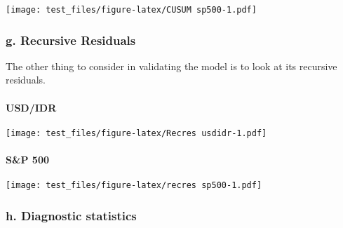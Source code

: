 \documentclass[]{article}
\newenvironment{Shaded}{\begin{snugshade}}{\end{snugshade}}
\newcommand{\KeywordTok}[1]{\textcolor[rgb]{0.13,0.29,0.53}{\textbf{#1}}}
\newcommand{\DataTypeTok}[1]{\textcolor[rgb]{0.13,0.29,0.53}{#1}}
\newcommand{\DecValTok}[1]{\textcolor[rgb]{0.00,0.00,0.81}{#1}}
\newcommand{\StringTok}[1]{\textcolor[rgb]{0.31,0.60,0.02}{#1}}
\newcommand{\OperatorTok}[1]{\textcolor[rgb]{0.81,0.36,0.00}{\textbf{#1}}}
\newcommand{\NormalTok}[1]{#1}
\let\oldparagraph\paragraph
\renewcommand{\paragraph}[1]{\oldparagraph{#1}\mbox{}}
\begin{document}
\texttt{[image: test\_files/figure-latex/CUSUM sp500-1.pdf]}

\subsubsection{g. Recursive Residuals}\label{g.-recursive-residuals}

The other thing to consider in validating the model is to look at its
recursive residuals.

\paragraph{USD/IDR}\label{usdidr-1}

\begin{Shaded}
\end{Shaded}

\texttt{[image: test\_files/figure-latex/Recres usdidr-1.pdf]}

\paragraph{S\&P 500}\label{sp-500-1}

\begin{Shaded}
\end{Shaded}

\texttt{[image: test\_files/figure-latex/recres sp500-1.pdf]}

\subsubsection{h. Diagnostic statistics}\label{h.-diagnostic-statistics}
\end{document}
